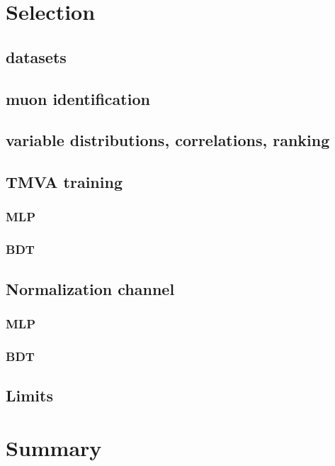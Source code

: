 \documentclass[10pt,a4paper]{article}
\begin{document}
\section{Selection}
\subsection{datasets}
\subsection{muon identification}
\subsection{variable distributions, correlations, ranking}
\subsection{TMVA training}
\subsubsection{MLP}
\subsubsection{BDT}
\subsection{Normalization channel}
\subsubsection{MLP}
\subsubsection{BDT}
\subsection{Limits}


\section{Summary}




\end{document}
